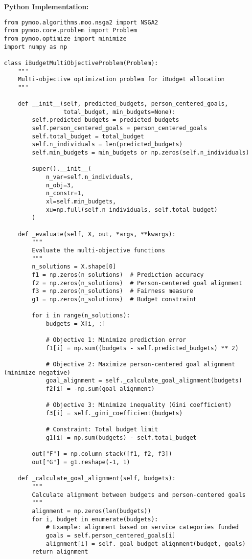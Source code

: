 \documentclass[12pt]{article}
\begin{document}
\textbf{Python Implementation:}
\begin{lstlisting}
from pymoo.algorithms.moo.nsga2 import NSGA2
from pymoo.core.problem import Problem
from pymoo.optimize import minimize
import numpy as np

class iBudgetMultiObjectiveProblem(Problem):
    """
    Multi-objective optimization problem for iBudget allocation
    """
    
    def __init__(self, predicted_budgets, person_centered_goals, 
                 total_budget, min_budgets=None):
        self.predicted_budgets = predicted_budgets
        self.person_centered_goals = person_centered_goals
        self.total_budget = total_budget
        self.n_individuals = len(predicted_budgets)
        self.min_budgets = min_budgets or np.zeros(self.n_individuals)
        
        super().__init__(
            n_var=self.n_individuals,
            n_obj=3,
            n_constr=1,
            xl=self.min_budgets,
            xu=np.full(self.n_individuals, self.total_budget)
        )
    
    def _evaluate(self, X, out, *args, **kwargs):
        """
        Evaluate the multi-objective functions
        """
        n_solutions = X.shape[0]
        f1 = np.zeros(n_solutions)  # Prediction accuracy
        f2 = np.zeros(n_solutions)  # Person-centered goal alignment
        f3 = np.zeros(n_solutions)  # Fairness measure
        g1 = np.zeros(n_solutions)  # Budget constraint
        
        for i in range(n_solutions):
            budgets = X[i, :]
            
            # Objective 1: Minimize prediction error
            f1[i] = np.sum((budgets - self.predicted_budgets) ** 2)
            
            # Objective 2: Maximize person-centered goal alignment (minimize negative)
            goal_alignment = self._calculate_goal_alignment(budgets)
            f2[i] = -np.sum(goal_alignment)
            
            # Objective 3: Minimize inequality (Gini coefficient)
            f3[i] = self._gini_coefficient(budgets)
            
            # Constraint: Total budget limit
            g1[i] = np.sum(budgets) - self.total_budget
        
        out["F"] = np.column_stack([f1, f2, f3])
        out["G"] = g1.reshape(-1, 1)
    
    def _calculate_goal_alignment(self, budgets):
        """
        Calculate alignment between budgets and person-centered goals
        """
        alignment = np.zeros(len(budgets))
        for i, budget in enumerate(budgets):
            # Example: alignment based on service categories funded
            goals = self.person_centered_goals[i]
            alignment[i] = self._goal_budget_alignment(budget, goals)
        return alignment
    

\end{lstlisting}
\end{document}
